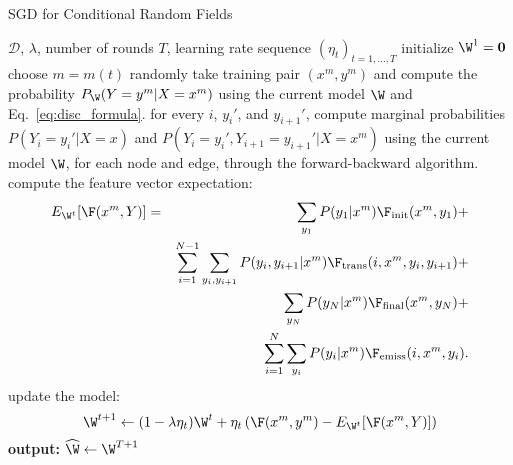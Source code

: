 \begin{algorithm}[h!]
   \caption{SGD for Conditional Random Fields \label{alg:crf_online}}
\begin{algorithmic}[1]
    $\mathcal{D}$, $\lambda$, number of rounds $T$,
   learning rate sequence $(\eta_t)_{t = 1,\ldots,T}$
   \STATE initialize $\W^1 = \mathbf{0}$
	\STATE choose $m=m(t)$ randomly
	\STATE take training pair $(x^m, y^m)$ and compute the probability 
	$P_{\W}(Y=y^m|X=x^m)$ using the current model ${\W}$ and Eq.~\ref{eq:disc_formula}.
	\STATE for every $i$, $y_i'$, and $y_{i+1}'$, 
	compute marginal probabilities $P(Y_i=y_i' | X=x)$ and  $P(Y_i=y_i', Y_{i+1}=y_{i+1}'| X=x^m)$ 
	using the current model $\W$, for each node and edge, 
        through the forward-backward algorithm.
	\STATE compute the feature vector expectation:  
	\begin{eqnarray}
	E_{\W^t}[\F(x^m,Y)] &=& \sum_{y_1} P(y_1|x^m)\F_{\mathrm{init}}(x^m,y_1) +\nonumber\\
	&& \sum_{i=1}^{N-1}\sum_{y_i,y_{i+1}} P(y_i,y_{i+1}|x^m)\F_{\mathrm{trans}}(i,x^m,y_i,y_{i+1}) +\nonumber\\
	&& \sum_{y_N} P(y_N|x^m)\F_{\mathrm{final}}(x^m,y_N) +\nonumber\\
	&& \sum_{i=1}^{N}\sum_{y_i} P(y_i|x^m)\F_{\mathrm{emiss}}(i,x^m,y_i).
	\end{eqnarray}
	\STATE update the model: 
	$$\W^{t+1} \leftarrow (1-\lambda \eta_t) \boldsymbol{\W}^{t} + \eta_t \left( \F(x^m,y^m) 
	- E_{\W^t}[\F(x^m,Y)]\right)$$
	\ENDFOR
   \STATE \textbf{output:} $\widehat{\W} \leftarrow \W^{T+1}$
\end{algorithmic}
\end{algorithm}


